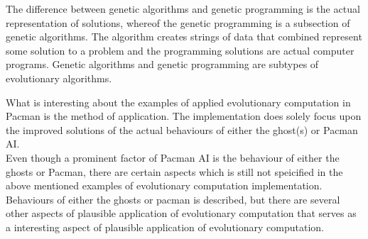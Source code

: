 The difference between genetic algorithms and genetic programming is the actual representation of solutions, whereof the genetic programming is a subsection of genetic algorithms. The algorithm creates strings of data that combined represent some solution to a problem and the programming solutions are actual computer programs.\cite{genetic}
Genetic algorithms and genetic programming are subtypes of evolutionary algorithms.

What is interesting about the examples of applied evolutionary computation in Pacman is the method of application. The implementation does solely focus upon the improved solutions of the actual behaviours of either the ghost(s) or Pacman AI.\\
Even though a prominent factor of Pacman AI is the behaviour of either the ghosts or Pacman, there are certain aspects which is still not speicified in the above mentioned examples of evolutionary computation implementation. Behaviours of either the ghosts or pacman is described, but there are several other aspects of plausible application of evolutionary computation that serves as a interesting aspect of plausible application of evolutionary computation.\\
